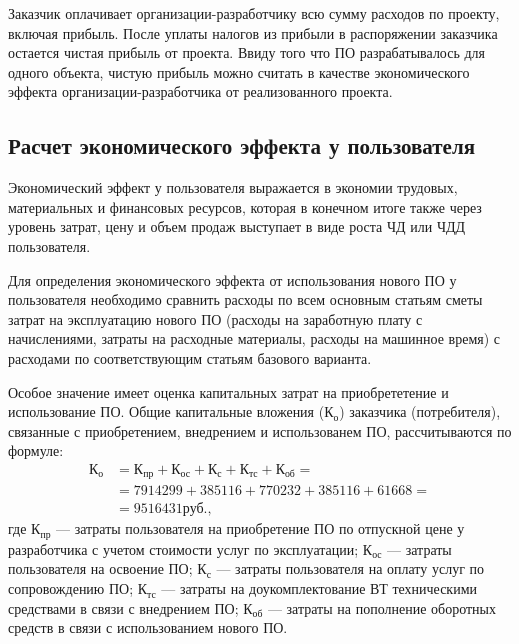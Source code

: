 Заказчик оплачивает организации-разработчику всю сумму расходов по проекту, включая прибыль. После уплаты налогов из прибыли в распоряжении заказчика остается чистая прибыль от проекта. Ввиду того что ПО разрабатывалось для одного объекта, чистую прибыль можно считать в качестве экономического эффекта организации\hyp{}разработчика от реализованного проекта.

\subsection{Расчет экономического эффекта у пользователя}
Экономический эффект у пользователя выражается в экономии трудовых, материальных и финансовых ресурсов, которая в конечном итоге также через уровень затрат, цену и объем продаж выступает в виде роста ЧД или ЧДД пользователя.

Для определения экономического эффекта от использования нового ПО у пользователя необходимо сравнить расходы по всем основным статьям сметы затрат на эксплуатацию нового ПО (расходы на заработную плату с начислениями, затраты на расходные материалы, расходы на машинное время) с расходами по соответствующим статьям базового варианта.

Особое значение имеет оценка капитальных затрат на приобрететение и использование ПО. Общие капитальные вложения ($\text{К}_\text{о}$) заказчика (потребителя), связанные с приобретением, внедрением и использованем ПО, рассчитываются по формуле:
\begin{align*}
  \text{К}_\text{о} &= \text{К}_\text{пр} + \text{К}_\text{ос} + \text{К}_\text{с} + \text{К}_\text{тс} + \text{К}_\text{об} =\\
  &= 7914299 + 385116 + 770232 + 385116 + 61668 =\\
  &= 9516431 \text{руб.},
\end{align*}
где $\text{К}_\text{пр}$ --- затраты пользователя на приобретение ПО по отпускной цене у разработчика с учетом стоимости услуг по эксплуатации;
$\text{К}_\text{ос}$ --- затраты пользователя на освоение ПО;
$\text{К}_\text{с}$ --- затраты пользователя на оплату услуг по сопровождению ПО;
$\text{К}_\text{тс}$ --- затраты на доукомплектование ВТ техническими средствами в связи с внедрением ПО;
$\text{К}_\text{об}$ --- затраты на пополнение оборотных средств в связи с использованием нового ПО.


